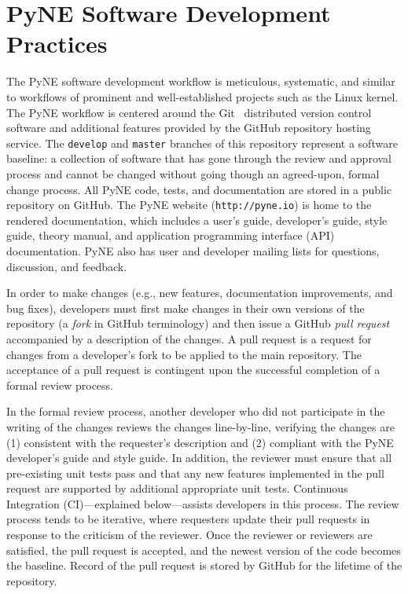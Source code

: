 \documentclass{anstrans}
\begin{document}
\section{PyNE Software Development Practices}

The PyNE software development workflow is meticulous, systematic, and similar
to workflows of prominent and well-established projects such as the Linux kernel.
The PyNE workflow is centered around the Git~\cite{git_2014} distributed version control software
and additional features provided by the GitHub repository hosting service.
The \texttt{develop} and \texttt{master} branches of this repository represent
a software baseline: a collection of software that has gone through the review and
approval process and cannot be changed without going though an agreed-upon, formal change process.
All PyNE code, tests, and documentation are stored in a public
repository on GitHub. The PyNE website (\texttt{http://pyne.io}) is home to the
rendered documentation, which includes a user's guide, developer's guide, style
guide, theory manual, and application programming interface (API) documentation.
PyNE also has user and developer mailing lists for questions, discussion, and feedback.

In order to make changes (e.g., new features, documentation improvements, and
bug fixes), developers must first make changes in their own versions of the
repository (a \emph{fork} in GitHub terminology) and then issue a GitHub \emph{pull
request} accompanied by a description of the changes. A pull request
is a request for changes from a developer's fork to be applied to the main
repository. The acceptance of a pull request is contingent upon the
successful completion of a formal review process.

In the formal review process, another developer who did not participate in the writing of the changes
reviews the changes line-by-line, verifying the changes are (1) consistent with
the requester's description and (2) compliant with the PyNE
developer's guide and style guide. In addition, the reviewer must
ensure that all pre-existing unit tests pass and that
any new features implemented in the pull request are supported by additional appropriate unit
tests. Continuous Integration (CI)---explained below---assists developers in this process.
The review process tends to be iterative, where requesters update their pull
requests in response to the criticism of the reviewer. Once the reviewer or
reviewers are satisfied, the pull request is accepted, and the newest version of the
code becomes the baseline. Record of the pull request is stored by GitHub for the lifetime of the repository.
\end{document}
